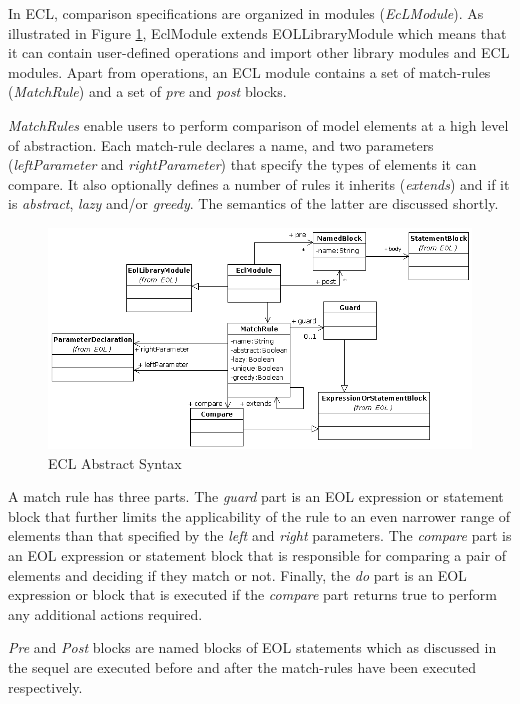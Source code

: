 In ECL, comparison specifications are organized in modules (\emph{EcLModule}). As illustrated in Figure \ref{fig:ECL}, EclModule extends EOLLibraryModule which means that it can contain user-defined operations and import other library modules and ECL modules. Apart from operations, an ECL module contains a set of match-rules (\emph{MatchRule}) and a set of \emph{pre} and \emph{post} blocks.

\emph{MatchRules} enable users to perform comparison of model elements at a high level of abstraction. Each match-rule declares a name, and two parameters (\emph{leftParameter} and \emph{rightParameter}) that specify the types of elements it can compare. It also optionally defines a number of rules it inherits (\emph{extends}) and if it is \emph{abstract}, \emph{lazy} and/or \emph{greedy}. The semantics of the latter are discussed shortly.

\begin{landscape}
\begin{figure}
	\centering
		\includegraphics{images/EclAbstractSyntax.png}
	\caption{ECL Abstract Syntax}
	\label{fig:ECL}
\end{figure}
\end{landscape}

A match rule has three parts. The \emph{guard} part is an EOL expression or statement block that further limits the applicability of the rule to an even narrower range of elements than that specified by the \emph{left} and \emph{right} parameters. The \emph{compare} part is an EOL expression or statement block that is responsible for comparing a pair of elements and deciding if they match or not. Finally, the \emph{do} part is an EOL expression or block that is executed if the \emph{compare} part returns true to perform any additional actions required.

\emph{Pre} and \emph{Post} blocks are named blocks of EOL statements which as discussed in the sequel are executed before and after the match-rules have been executed respectively.

